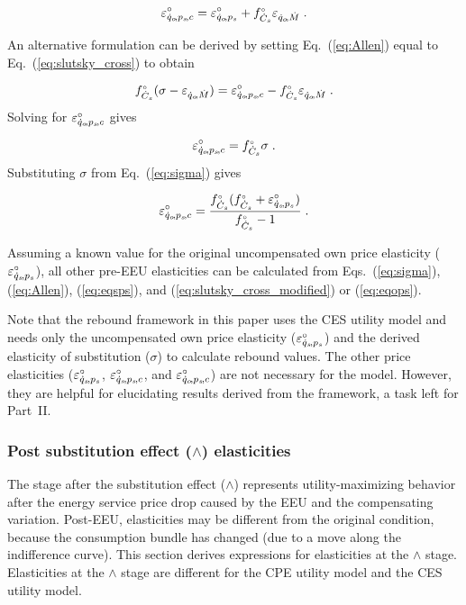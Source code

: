 \documentclass[12pt]{article}\usepackage[]{graphicx}\usepackage[]{xcolor}
\begin{document}
\begin{equation} \label{eq:slutsky_cross_modified}
  \varepsilon^\circ_{\dot{q}_o\!,p_s\!,c} = \varepsilon^\circ_{\dot{q}_o\!,p_s} + {}{f}^{\scriptscriptstyle \circ}_{\dot{C}_s} \varepsilon_{\dot{q}_o\!,\dot{M}} \; .
\end{equation}

An alternative formulation can be derived by setting 
Eq.~(\ref{eq:Allen}) equal to 
Eq.~(\ref{eq:slutsky_cross})
to obtain

\begin{equation}
  {}{f}^{\scriptscriptstyle \circ}_{\dot{C}_s} (\sigma - \varepsilon_{\dot{q}_o\!,\dot{M}}) = \varepsilon^\circ_{\dot{q}_o\!,p_s\!,c} - {}{f}^{\scriptscriptstyle \circ}_{\dot{C}_s} \varepsilon_{\dot{q}_o\!,\dot{M}} \; .
\end{equation}
%
Solving for $\varepsilon^\circ_{\dot{q}_o\!,p_s\!,c}$ gives

\begin{equation} \label{eq:eqops_general}
  \varepsilon^\circ_{\dot{q}_o\!,p_s\!,c} = {}{f}^{\scriptscriptstyle \circ}_{\dot{C}_s} \sigma \; .
\end{equation}
%
Substituting $\sigma$ from Eq.~(\ref{eq:sigma}) gives

\begin{equation} \label{eq:eqops}
  \varepsilon^\circ_{\dot{q}_o\!,p_s\!,c} = \frac{{}{f}^{\scriptscriptstyle \circ}_{\dot{C}_s} ({}{f}^{\scriptscriptstyle \circ}_{\dot{C}_s} + \varepsilon^\circ_{\dot{q}_s\!,p_s})}{{}{f}^{\scriptscriptstyle \circ}_{\dot{C}_s} - 1} \; .
\end{equation}

Assuming a known value for the original uncompensated own price elasticity ($\varepsilon^\circ_{\dot{q}_s\!,p_s}$), 
all other pre-EEU elasticities can be calculated from 
Eqs.~(\ref{eq:sigma}), (\ref{eq:Allen}), (\ref{eq:eqsps}), and
(\ref{eq:slutsky_cross_modified}) or (\ref{eq:eqops}).

Note that the rebound framework in this paper uses the CES utility model and
needs only the uncompensated own price elasticity ($\varepsilon^\circ_{\dot{q}_s\!,p_s}$)
and the derived elasticity of substitution ($\sigma$) to calculate rebound values.
The other price elasticities ($\varepsilon^\circ_{\dot{q}_s\!,p_s}$, $\varepsilon^\circ_{\dot{q}_s\!,p_s\!,c}$, and $\varepsilon^\circ_{\dot{q}_o\!,p_s\!,c}$)
are not necessary for the model. 
However, they are helpful for elucidating results derived from the framework,
a task left for Part~II.


\subsubsection{Post substitution effect ($\wedge$) elasticities} 
\label{sec:post_sub_elasticities}

The stage after the substitution effect ($\wedge$)
represents utility-maximizing behavior after the energy service price drop
caused by the EEU and the compensating variation.
Post-EEU, elasticities may be different from the original condition,
because the consumption bundle has changed (due to a move along
the indifference curve).
This section derives expressions for elasticities at the $\wedge$ stage.
Elasticities at the $\wedge$ stage are different 
for the CPE utility model and the CES utility model.
\end{document}
